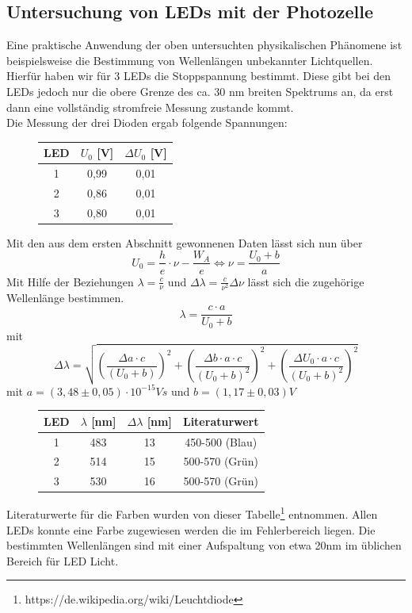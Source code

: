 \documentclass{scrartcl}
\begin{document}
	\subsection{Untersuchung von LEDs mit der Photozelle}
		Eine praktische Anwendung der oben untersuchten physikalischen Phänomene ist beispielsweise
		die Bestimmung von Wellenlängen unbekannter Lichtquellen. Hierfür haben wir für 3 LEDs die 
		Stoppspannung bestimmt. Diese gibt bei den LEDs jedoch nur die obere Grenze des ca. 30 nm breiten Spektrums an,
		da erst dann eine vollständig stromfreie Messung zustande kommt.\\
		Die Messung der drei Dioden ergab folgende Spannungen:
		\begin{figure}[H]
			\centering
			\begin{tabular}{|c|c|c|}
				\hline
				LED & $U_0$ [V] & $\Delta U_0$ [V] \\
				\hline
				1 & 0,99 & 0,01\\
				2 & 0,86 & 0,01\\
				3 & 0,80 & 0,01\\
				\hline
			\end{tabular}
		\end{figure}
		Mit den aus dem ersten Abschnitt gewonnenen Daten lässt sich nun über
		\begin{equation}
			U_0 = \frac{h}{e}\cdot \nu - \frac{W_A}{e}
			\Leftrightarrow 
			\nu = \frac{U_0 + b}{a}
		\end{equation}
		Mit Hilfe der Beziehungen $ \lambda = \frac{c}{\nu}$ und $\Delta \lambda = \frac{c}{\nu^2} \Delta \nu$
		lässt sich die zugehörige Wellenlänge bestimmen.
		\begin{equation}
			\lambda = \frac{c\cdot a }{U_0 + b}
		\end{equation}
		mit
		\begin{equation}
			\Delta \lambda = \sqrt{(\frac{\Delta a \cdot c}{(U_0+b)})^2+(\frac{\Delta b \cdot a \cdot c}{(U_0+b)^2})^2+(\frac{\Delta U_0 \cdot a \cdot c}{(U_0+b)^2})^2}
		\end{equation}
		mit $a = (3,48 \pm 0,05) \cdot 10^{-15} Vs$ und $b=(1,17 \pm 0,03)V$
		\begin{figure}[H]
			\centering
			\begin{tabular}{|c|c|c|c|}
				\hline
				LED & $\lambda$ [nm] & $\Delta\lambda$ [nm] & Literaturwert \\
				\hline
				1 & 483 & 13 & 450-500 (Blau)\\
				2 & 514 & 15 & 500-570 (Grün)\\
				3 & 530 & 16 & 500-570 (Grün)\\
				\hline
			\end{tabular}
		\end{figure}
		Literaturwerte für die Farben wurden von dieser Tabelle\footnote{https://de.wikipedia.org/wiki/Leuchtdiode} entnommen.
		Allen LEDs konnte eine Farbe zugewiesen werden die im Fehlerbereich liegen. Die bestimmten Wellenlängen sind mit einer 
		Aufspaltung von etwa 20nm im üblichen Bereich für LED Licht.  
\end{document}
